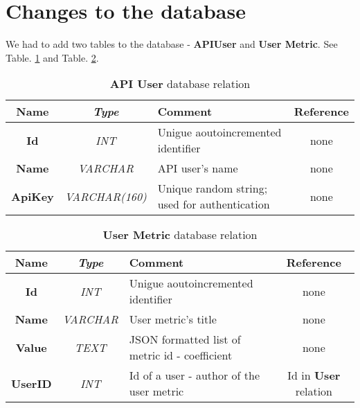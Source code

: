 \section{Changes to the database}

	We had to add two tables to the database - \textbf{APIUser} and \textbf{User Metric}. See Table. \ref{apiusertable} and Table. \ref{umetrictable}.
	
	\begin{table}[t!]
		\centering
		\begin{tabular}{| >{\bf}c | >{\em}c | l | c |} 
			\hline
			Name	& Type			& Comment										& Reference	\\ \hline
			Id		& INT			& Unigue aoutoincremented identifier			& none		\\
			Name	& VARCHAR		& API user's name								& none		\\
			ApiKey	& VARCHAR(160)	& Unique random string; used for authentication	& none		\\
			\hline
		\end{tabular}
		\caption{\textbf{API User} database relation}
		\label{apiusertable}
	\end{table}
	
	\begin{table}[t!]
		\centering
		\begin{tabular}{| >{\bf}c | >{\em}c | l | c |} 
			\hline
			Name	& Type			& Comment												& Reference						\\ \hline
			Id		& INT			& Unigue aoutoincremented identifier					& none							\\
			Name	& VARCHAR		& User metric's title									& none							\\
			Value	& TEXT			& JSON formatted list of metric id - coefficient		& none							\\
			UserID	& INT			& Id of a user - author of the user metric				& Id in \textbf{User} relation	\\
			\hline
		\end{tabular}
		\caption{\textbf{User Metric} database relation}
		\label{umetrictable}
	\end{table}